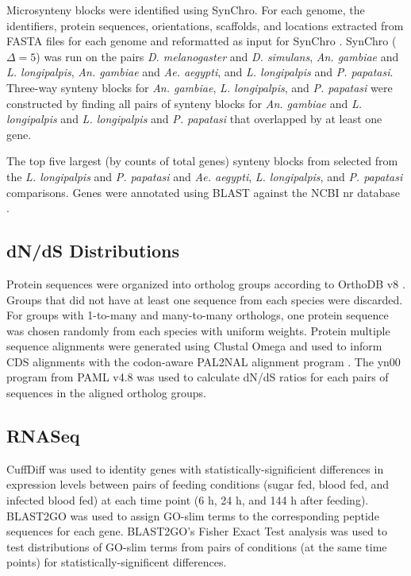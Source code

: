 Microsynteny blocks were identified using SynChro. For each genome, the identifiers, protein sequences, orientations, scaffolds, and locations extracted from FASTA files for each genome and reformatted as input for SynChro \cite{Drillon2014}.  SynChro ($\Delta=5$) was run on the pairs \emph{D. melanogaster} and \emph{D. simulans}, \emph{An. gambiae} and \emph{L. longipalpis}, \emph{An. gambiae} and \emph{Ae. aegypti}, and \emph{L. longipalpis} and \emph{P. papatasi}.  Three-way synteny blocks for \emph{An. gambiae}, \emph{L. longipalpis}, and \emph{P. papatasi} were constructed by finding all pairs of synteny blocks for \emph{An. gambiae} and \emph{L. longipalpis} and \emph{L. longipalpis} and \emph{P. papatasi} that overlapped by at least one gene.  

The top five largest (by counts of total genes) synteny blocks from selected from the \emph{L. longipalpis} and \emph{P. papatasi} and \emph{Ae. aegypti}, \emph{L. longipalpis}, and \emph{P. papatasi} comparisons.  Genes were annotated using BLAST against the NCBI nr database \cite{Pruitt2007}.

\subsection{dN/dS Distributions}
Protein sequences were organized into ortholog groups according to OrthoDB v8 \cite{Kriventseva2015}. Groups that did not have at least one sequence from each species were discarded.  For groups with 1-to-many and many-to-many orthologs, one protein sequence was chosen randomly from each species with uniform weights. Protein multiple sequence alignments were generated using Clustal Omega \cite{Sievers2011} and used to inform CDS alignments with the codon-aware PAL2NAL alignment program \cite{Suyama2006}.  The yn00 program from PAML v4.8 \cite{Yang2007} was used to calculate dN/dS ratios for each pairs of sequences in the aligned ortholog groups.

\subsection{RNASeq}
CuffDiff \cite{Trapnell2010} was used to identity genes with statistically-significient differences in expression levels between pairs of feeding conditions (sugar fed, blood fed, and infected blood fed) at each time point (6 h, 24 h, and 144 h after feeding).  BLAST2GO \cite{Conesa2005,Gotz2008} was used to assign GO-slim terms \cite{Consortium2004} to the corresponding peptide sequences for each gene. BLAST2GO's Fisher Exact Test analysis was used to test distributions of GO-slim terms from pairs of conditions (at the same time points) for statistically-significent differences.

